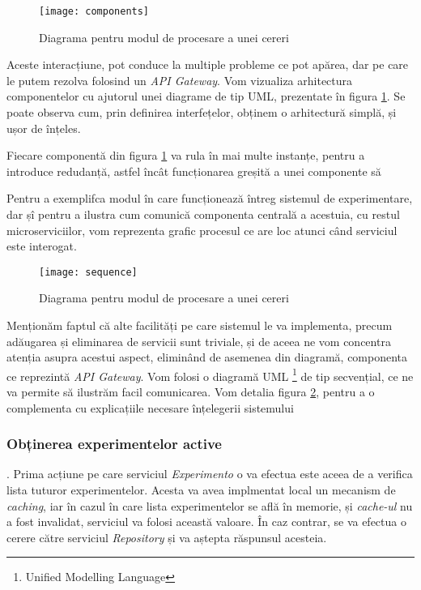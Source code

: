 \begin{figure}[H]
	\centering
	\texttt{[image: components]}
	\caption{Diagrama pentru modul de procesare a unei cereri}
	\label{fig:components}
\end{figure}

Aceste interacțiune, pot conduce la multiple probleme ce pot apărea, dar pe care le putem rezolva folosind un \textit{API Gateway}. Vom vizualiza arhitectura componentelor cu ajutorul unei diagrame de tip UML, prezentate în figura \ref{fig:components}. Se poate observa cum, prin definirea interfețelor, obținem o arhitectură simplă, și ușor de înțeles.

\begin{remark}
	Fiecare componentă din figura \ref{fig:components} va rula în mai multe instanțe, pentru a introduce redudanță, astfel încât funcționarea greșită a unei componente să 
\end{remark}  

Pentru a exemplifca modul în care funcționează întreg sistemul de experimentare, dar șî pentru a ilustra cum comunică componenta centrală a acestuia, cu restul microserviciilor, vom reprezenta grafic procesul ce are loc atunci când serviciul este interogat. 

\begin{figure}[H]
	\centering
	\texttt{[image: sequence]}
	\caption{Diagrama pentru modul de procesare a unei cereri}
	\label{fig:sequence}
\end{figure}

Menționăm faptul că alte facilități pe care sistemul le va implementa, precum adăugarea și eliminarea de servicii sunt triviale, și de aceea ne vom concentra atenția asupra acestui aspect, eliminând de asemenea din diagramă, componenta ce reprezintă \textit{API Gateway}. Vom folosi o diagramă UML \footnote{Unified Modelling Language} de tip secvențial, ce ne va permite să ilustrăm facil comunicarea. Vom detalia figura \ref{fig:sequence}, pentru a o complementa cu explicațiile necesare înțelegerii sistemului

\subsubsection{Obținerea experimentelor active}
. Prima acțiune pe care serviciul \textit{Experimento} o va efectua este aceea de a verifica lista tuturor experimentelor. Acesta va avea implmentat local un mecanism de \textit{caching}, iar în cazul în care lista experimentelor se află în memorie, și \textit{cache-ul} nu a fost invalidat, serviciul va folosi această valoare. În caz contrar, se va efectua o cerere către serviciul \textit{Repository} și va aștepta răspunsul acesteia. 

